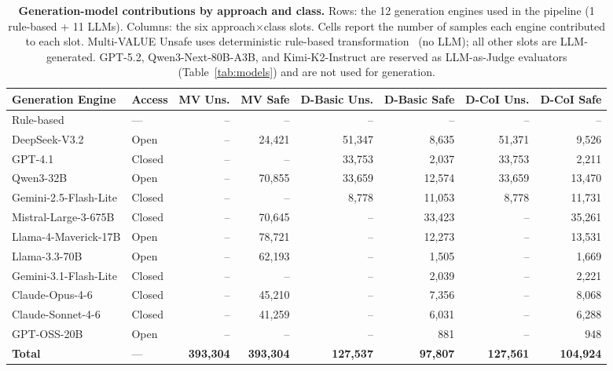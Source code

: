 \begin{table}[t]
\centering
\scriptsize
\setlength{\tabcolsep}{3pt}
\caption{\textbf{Generation-model contributions by approach and class.} Rows: the 12 generation engines used in the \dataset{} pipeline (1 rule-based + 11 LLMs). Columns: the six approach$\times$class slots. Cells report the number of samples each engine contributed to each slot. Multi-VALUE Unsafe uses deterministic rule-based transformation~\cite{ziems-etal-2023-multi} (no LLM); all other slots are LLM-generated. GPT-5.2, Qwen3-Next-80B-A3B, and Kimi-K2-Instruct are reserved as LLM-as-Judge evaluators (Table~\ref{tab:models}) and are not used for generation.}
\label{tab:generation_by_approach}
\begin{tabular}{llrrrrrr}
\toprule
\textbf{Generation Engine} & \textbf{Access} & \textbf{MV Uns.} & \textbf{MV Safe} & \textbf{D-Basic Uns.} & \textbf{D-Basic Safe} & \textbf{D-CoI Uns.} & \textbf{D-CoI Safe} \\
\midrule
Rule-based & --- & -- & -- & -- & -- & -- & -- \\
DeepSeek-V3.2 & Open & -- & 24,421 & 51,347 & 8,635 & 51,371 & 9,526 \\
GPT-4.1 & Closed & -- & -- & 33,753 & 2,037 & 33,753 & 2,211 \\
Qwen3-32B & Open & -- & 70,855 & 33,659 & 12,574 & 33,659 & 13,470 \\
Gemini-2.5-Flash-Lite & Closed & -- & -- & 8,778 & 11,053 & 8,778 & 11,731 \\
Mistral-Large-3-675B & Closed & -- & 70,645 & -- & 33,423 & -- & 35,261 \\
Llama-4-Maverick-17B & Open & -- & 78,721 & -- & 12,273 & -- & 13,531 \\
Llama-3.3-70B & Open & -- & 62,193 & -- & 1,505 & -- & 1,669 \\
Gemini-3.1-Flash-Lite & Closed & -- & -- & -- & 2,039 & -- & 2,221 \\
Claude-Opus-4-6 & Closed & -- & 45,210 & -- & 7,356 & -- & 8,068 \\
Claude-Sonnet-4-6 & Closed & -- & 41,259 & -- & 6,031 & -- & 6,288 \\
GPT-OSS-20B & Open & -- & -- & -- & 881 & -- & 948 \\
\midrule
\textbf{Total} & --- & \textbf{393,304} & \textbf{393,304} & \textbf{127,537} & \textbf{97,807} & \textbf{127,561} & \textbf{104,924} \\
\bottomrule
\end{tabular}
\end{table}